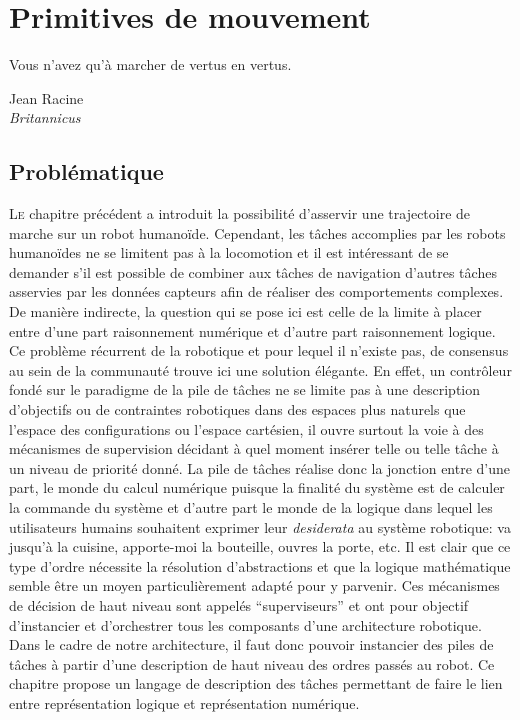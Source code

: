 \chapter{Primitives de mouvement}
\label{chap:primitive}

\epigraph{Vous n'avez qu'à marcher de vertus en vertus.}{Jean
  Racine\\\emph{Britannicus}}
\clearpage

\section{Problématique}

\lettrine[lines=2, lraise=0.1, nindent=0em, slope=-.5em]%
{L}{e} chapitre précédent a introduit la possibilité d'asservir une
trajectoire de marche sur un robot humanoïde. Cependant, les tâches
accomplies par les robots humanoïdes ne se limitent pas à la
locomotion et il est intéressant de se demander s'il est possible de
combiner aux tâches de navigation d'autres tâches asservies par les
données capteurs afin de réaliser des comportements complexes. De
manière indirecte, la question qui se pose ici est celle de la limite
à placer entre d'une part raisonnement numérique et d'autre part
raisonnement logique. Ce problème récurrent de la robotique et pour
lequel il n'existe pas, de consensus au sein de la communauté trouve
ici une solution élégante. En effet, un contrôleur fondé sur le
paradigme de la pile de tâches ne se limite pas
à une description d'objectifs ou de contraintes robotiques dans des
espaces plus naturels que l'espace des configurations ou l'espace
cartésien, il ouvre surtout la voie à des mécanismes de supervision
décidant à quel moment insérer telle ou telle tâche à un niveau de
priorité donné. La pile de tâches réalise donc la jonction entre d'une
part, le monde du calcul numérique puisque la finalité du système est
de calculer la commande du système et d'autre part le monde de la
logique dans lequel les utilisateurs humains souhaitent exprimer leur
\emph{desiderata} au système robotique: va jusqu'à la cuisine,
apporte-moi la bouteille, ouvres la porte, etc. Il est clair que ce
type d'ordre nécessite la résolution d'abstractions et que la logique
mathématique semble être un moyen particulièrement adapté pour y
parvenir. Ces mécanismes de décision de haut niveau sont appelés
``superviseurs'' et ont pour objectif d'instancier et d'orchestrer
tous les composants d'une architecture robotique. Dans le cadre de
notre architecture, il faut donc pouvoir instancier des piles de
tâches à partir d'une description de haut niveau des ordres passés au
robot. Ce chapitre propose un langage de description des tâches
permettant de faire le lien entre représentation logique et
représentation numérique.


